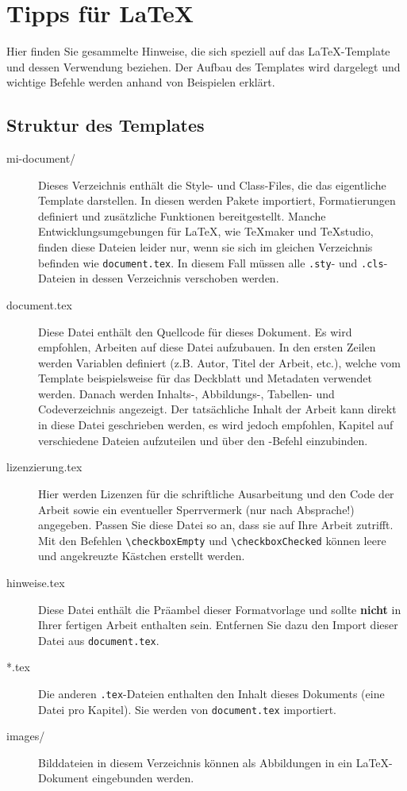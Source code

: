 \chapter{Tipps für \LaTeX}\label{latex}

Hier finden Sie gesammelte Hinweise, die sich speziell auf das \LaTeX-Template und dessen Verwendung beziehen. Der Aufbau des Templates wird dargelegt und wichtige Befehle werden anhand von Beispielen erklärt.

\section{Struktur des Templates}

\begin{description}
    \item[mi-document/]{Dieses Verzeichnis enthält die Style- und Class-Files, die das eigentliche Template darstellen. In diesen werden Pakete importiert, Formatierungen definiert und zusätzliche Funktionen bereitgestellt. Manche Entwicklungsumgebungen für \LaTeX, wie TeXmaker und TeXstudio, finden diese Dateien leider nur, wenn sie sich im gleichen Verzeichnis befinden wie \verb|document.tex|. In diesem Fall müssen alle \verb|.sty|- und \verb|.cls|-Dateien in dessen Verzeichnis verschoben werden.}
    \item[document.tex]{Diese Datei enthält den Quellcode für dieses Dokument. Es wird empfohlen, Arbeiten auf diese Datei aufzubauen. In den ersten Zeilen werden Variablen definiert (z.B. Autor, Titel der Arbeit, etc.), welche vom Template beispielsweise für das Deckblatt und Metadaten verwendet werden. Danach werden Inhalts-, Abbildungs-, Tabellen- und Codeverzeichnis angezeigt. Der tatsächliche Inhalt der Arbeit kann direkt in diese Datei geschrieben werden, es wird jedoch empfohlen, Kapitel auf verschiedene Dateien aufzuteilen und über den \verb||-Befehl einzubinden.}
    \item[lizenzierung.tex]{Hier werden Lizenzen für die schriftliche Ausarbeitung und den Code der Arbeit sowie ein eventueller Sperrvermerk (nur nach Absprache!) angegeben. Passen Sie diese Datei so an, dass sie auf Ihre Arbeit zutrifft. Mit den Befehlen \verb|\checkboxEmpty| und \verb|\checkboxChecked| können leere und angekreuzte Kästchen erstellt werden.}
    \item[hinweise.tex]{Diese Datei enthält die Präambel dieser Formatvorlage und sollte \textbf{nicht} in Ihrer fertigen Arbeit enthalten sein. Entfernen Sie dazu den Import dieser Datei aus \verb|document.tex|.}
    \item[*.tex]{Die anderen \verb|.tex|-Dateien enthalten den Inhalt dieses Dokuments (eine Datei pro Kapitel). Sie werden von \verb|document.tex| importiert.}
    \item[images/]{Bilddateien in diesem Verzeichnis können als Abbildungen in ein \LaTeX-Dokument eingebunden werden.}
\end{description}

